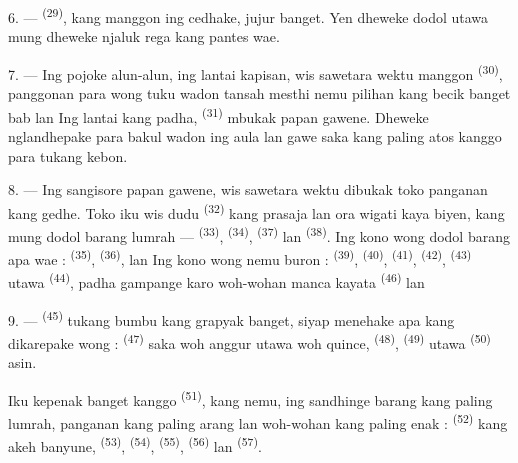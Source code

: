 \VUsaut{4.0mm}
\VUsaut{3.0mm}

6. ---  \textsuperscript{(29)}, kang manggon ing
cedhake, jujur banget. Yen dheweke dodol  utawa mung  dheweke njaluk rega kang pantes
wae.

7. --- Ing pojoke alun-alun, ing lantai kapisan, wis sawetara wektu
manggon  \textsuperscript{(30)}, panggonan para
wong tuku wadon tansah mesthi nemu pilihan kang becik banget bab
 lan  Ing lantai kang
padha,  \textsuperscript{(31)} mbukak papan
gawene. Dheweke nglandhepake  para bakul wadon ing aula
lan gawe  saka  kang paling atos kanggo para
tukang kebon.

\VUsaut{4.0mm}
\VUsaut{3.0mm}

8. --- Ing sangisore papan gawene, wis sawetara wektu dibukak toko
panganan kang gedhe. Toko iku wis dudu 
\textsuperscript{(32)} kang prasaja lan ora wigati kaya biyen, kang mung
dodol barang lumrah —  \textsuperscript{(33)},
 \textsuperscript{(34)}, 
\textsuperscript{(37)} lan  \textsuperscript{(38)}. Ing kono
wong dodol barang apa wae : 
 \textsuperscript{(35)}, 
\textsuperscript{(36)},  lan
 Ing kono wong nemu buron : 
\textsuperscript{(39)},  \textsuperscript{(40)},
 \textsuperscript{(41)}, 
\textsuperscript{(42)},  \textsuperscript{(43)} utawa
 \textsuperscript{(44)}, padha gampange karo
woh-wohan manca kayata  \textsuperscript{(46)} lan

9. ---  \textsuperscript{(45)} tukang bumbu kang grapyak
banget, siyap menehake apa kang dikarepake wong : 
\textsuperscript{(47)} saka woh anggur utawa woh quince, 
\textsuperscript{(48)},  \textsuperscript{(49)} utawa
 \textsuperscript{(50)} asin.

Iku kepenak banget kanggo  \textsuperscript{(51)},
kang nemu, ing sandhinge barang kang paling lumrah, panganan kang
paling arang lan woh-wohan kang paling enak : 
\textsuperscript{(52)} kang akeh banyune, 
\textsuperscript{(53)},  \textsuperscript{(54)},
 \textsuperscript{(55)}, 
\textsuperscript{(56)} lan  \textsuperscript{(57)}.

